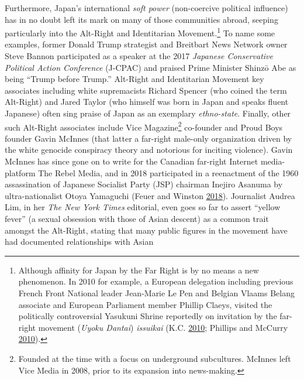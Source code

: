 \documentclass[10pt,british,A4paper,twoside]{memoir}
\begin{document}
Furthermore, Japan's international \emph{soft power} (non-coercive
political influence) has in no doubt left its mark on many of those
communities abroad, seeping particularly into the Alt-Right and
Identitarian Movement.\footnote{Although affinity for Japan by the Far
  Right is by no means a new phenomenon. In 2010 for example, a European
  delegation including previous French Front National leader Jean-Marie
  Le Pen and Belgian Vlaams Belang associate and European Parliament
  member Phillip Claeys, visited the politically controversial Yasukuni
  Shrine reportedly on invitation by the far-right movement (\emph{Uyoku
  Dantai}) \emph{issuikai} (K.C.
  \protect\hyperlink{ref-k.c._how_2010}{2010}; Phillips and McCurry
  \protect\hyperlink{ref-phillips_bnp_2010}{2010}).\label{issuikai}} To
name some examples, former Donald Trump strategist and Breitbart News
Network owner Steve Bannon participated as a speaker at the 2017
\emph{Japanese Conservative Political Action Conference} (J-CPAC) and
praised Prime Minister Shinzō Abe as being ``Trump before Trump.''
Alt-Right and Identitarian Movement key associates including white
supremacists Richard Spencer (who coined the term Alt-Right) and Jared
Taylor (who himself was born in Japan and speaks fluent Japanese) often
sing praise of Japan as an exemplary \emph{ethno-state}. Finally, other
such Alt-Right associates include Vice Magazine\footnote{Founded at the
  time with a focus on underground subcultures. McInnes left Vice Media
  in 2008, prior to its expansion into news-making.} co-founder and
Proud Boys founder Gavin McInnes (that latter a far-right male-only
organization driven by the white genocide conspiracy theory and
notorious for inciting violence). Gavin McInnes has since gone on to
write for the Canadian far-right Internet media-platform The Rebel
Media, and in 2018 participated in a reenactment of the 1960
assassination of Japanese Socialist Party (JSP) chairman Inejiro Asanuma
by ultra-nationalist Otoya Yamaguchi (Feuer and Winston
\protect\hyperlink{ref-feuer_founder_2018}{2018}). Journalist Audrea
Lim, in her \emph{The New York Times} editorial, even goes so far to
assert ``yellow fever'' (a sexual obsession with those of Asian descent)
as a common trait amongst the Alt-Right, stating that many public
figures in the movement have had documented relationships with Asian
\end{document}
